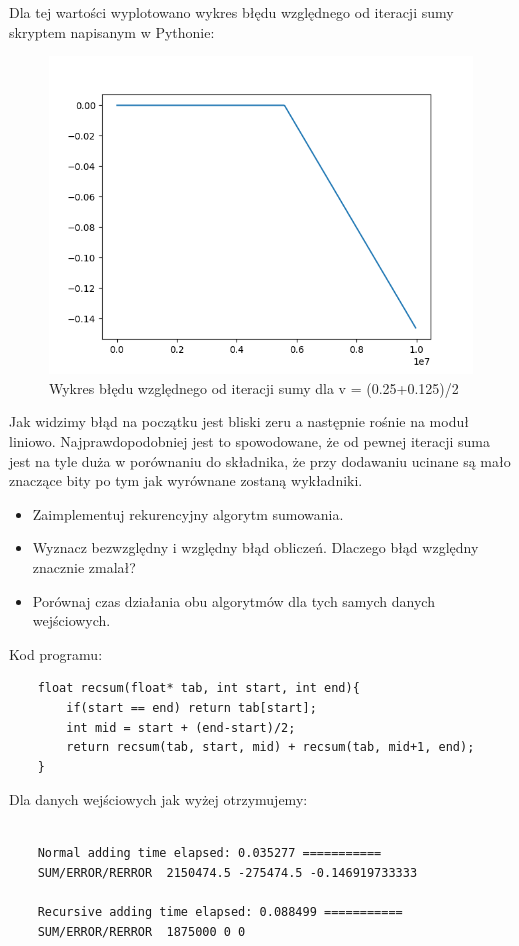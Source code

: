 Dla tej wartości wyplotowano wykres błędu względnego od iteracji sumy skryptem napisanym w Pythonie:
\begin{figure}[!ht]
	\centering
	\includegraphics[width=.7\linewidth]{img/plot_1.png}
	\caption{Wykres błędu względnego od iteracji sumy dla v = (0.25+0.125)/2}
\end{figure}
	Jak widzimy błąd na początku jest bliski zeru a następnie rośnie na moduł liniowo.
	Najprawdopodobniej jest to spowodowane, że od pewnej iteracji suma jest na tyle duża w porównaniu do składnika, że przy dodawaniu ucinane są mało znaczące bity po tym jak wyrównane zostaną wykładniki.
\begin{itemize}
	\item	Zaimplementuj rekurencyjny algorytm sumowania.
	\item Wyznacz bezwzględny i względny błąd obliczeń. Dlaczego błąd względny znacznie zmalał?
	\item Porównaj czas działania obu algorytmów dla tych samych danych wejściowych.
	
	
\end{itemize}

Kod programu:

\begin{verbatim}
	float recsum(float* tab, int start, int end){
		if(start == end) return tab[start];
		int mid = start + (end-start)/2;
		return recsum(tab, start, mid) + recsum(tab, mid+1, end);
	}
\end{verbatim}

Dla danych wejściowych jak wyżej otrzymujemy:
\begin{lstlisting}
	
	Normal adding time elapsed: 0.035277 ===========
	SUM/ERROR/RERROR  2150474.5 -275474.5 -0.146919733333
	
	Recursive adding time elapsed: 0.088499 ===========
	SUM/ERROR/RERROR  1875000 0 0
\end{lstlisting}


